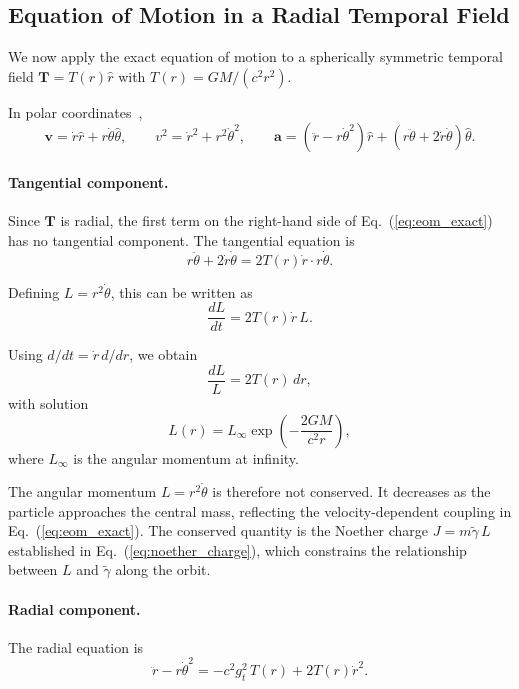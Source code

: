 \documentclass[12pt]{article}
\begin{document}
\subsection{Equation of Motion in a Radial Temporal Field}
\label{sec:radial}

We now apply the exact equation of motion to a spherically symmetric temporal field $\mathbf{T} = T(r)\hat{r}$ with $T(r) = GM/(c^2 r^2)$.

In polar coordinates~\cite{Goldstein2002},
$$
\mathbf{v} = \dot{r}\hat{r} + r\dot{\theta}\hat{\theta}, \qquad
v^2 = \dot{r}^2 + r^2\dot{\theta}^2, \qquad
\mathbf{a} = (\ddot{r} - r\dot{\theta}^2)\hat{r}
            + (r\ddot{\theta} + 2\dot{r}\dot{\theta})\hat{\theta}.
$$

\paragraph{Tangential component.}

Since $\mathbf{T}$ is radial, the first term on the right-hand side of Eq.~(\ref{eq:eom_exact}) has no tangential component. The tangential equation is
$$
r\ddot{\theta} + 2\dot{r}\dot{\theta}
= 2T(r)\dot{r}\cdot r\dot{\theta} .
$$

Defining $L = r^2\dot{\theta}$, this can be written as
\begin{equation}
\frac{dL}{dt} = 2T(r)\dot{r}\,L .
\label{eq:dLdt}
\end{equation}

Using $d/dt = \dot{r}\,d/dr$, we obtain
$$
\frac{dL}{L} = 2T(r)\,dr ,
$$
with solution
\begin{equation}
L(r) = L_\infty \exp\!\left(-\frac{2GM}{c^2 r}\right) ,
\label{eq:L_evolution}
\end{equation}
where $L_\infty$ is the angular momentum at infinity.

The angular momentum $L = r^2\dot{\theta}$ is therefore not conserved. It decreases as the particle approaches the central mass, reflecting the velocity-dependent coupling in Eq.~(\ref{eq:eom_exact}). The conserved quantity is the Noether charge $J = m\tilde{\gamma}\,L$ established in Eq.~(\ref{eq:noether_charge}), which constrains the relationship between $L$ and $\tilde{\gamma}$ along the orbit.

\paragraph{Radial component.}

The radial equation is
$$
\ddot{r} - r\dot{\theta}^2 = -c^2 g_t^2\,T(r) + 2T(r)\dot{r}^2 .
$$
\end{document}
